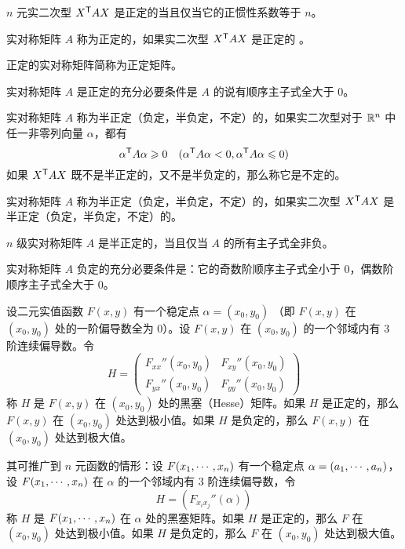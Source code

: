 \begin{theorem}
    $n$ 元实二次型 ${X}^\mathsf{T}AX$ 是正定的当且仅当它的正惯性系数等于 $n$。
\end{theorem}

\begin{definition}
    实对称矩阵 $A$ 称为正定的，如果实二次型 ${X}^\mathsf{T}AX$ 是正定的 。
\end{definition}

正定的实对称矩阵简称为正定矩阵。

\begin{theorem}
    实对称矩阵 $A$ 是正定的充分必要条件是 $A$ 的说有顺序主子式全大于 $0$。
\end{theorem}

\begin{definition}
    实对称矩阵 $A$ 称为半正定（负定，半负定，不定）的，如果实二次型对于 $\mathbb{R}^n$ 中任一非零列向量 $\alpha$，都有
    \[{\alpha}^\mathsf{T}A\alpha \geqslant 0 \quad ({\alpha}^\mathsf{T}A\alpha<0,{\alpha}^\mathsf{T}A\alpha\leqslant 0)\]
    如果 ${X}^\mathsf{T}AX$ 既不是半正定的，又不是半负定的，那么称它是不定的。
\end{definition}

\begin{definition}
    实对称矩阵 $A$ 称为半正定（负定，半负定，不定）的，如果实二次型 ${X}^\mathsf{T}AX$ 是半正定（负定，半负定，不定）的。
\end{definition}

\begin{theorem}
    $n$ 级实对称矩阵 $A$ 是半正定的，当且仅当 $A$ 的所有主子式全非负。
\end{theorem}

\begin{theorem}
    实对称矩阵 $A$ 负定的充分必要条件是：它的奇数阶顺序主子式全小于 $0$，偶数阶顺序主子式全大于 $0$。
\end{theorem}

\begin{theorem}
    设二元实值函数 $F(x,y)$ 有一个稳定点 $\alpha=(x_0,y_0)$ （即 $F(x,y)$ 在 $(x_0,y_0)$ 处的一阶偏导数全为 $0$）。设 $F(x,y)$ 在 $(x_0,y_0)$ 的一个邻域内有 3 阶连续偏导数。令
    \[H = \left(\begin{matrix}
                F_{xx}''(x_0,y_0) & F_{xy}''(x_0,y_0)  \\
                F_{yx}''(x_0,y_0) & F_{yy}''(x_0,y_0)
            \end{matrix}\right)\]
    称 $H$ 是 $F(x,y)$ 在 $(x_0,y_0)$ 处的黑塞（Hesse）矩阵。如果 $H$ 是正定的，那么 $F(x,y)$ 在 $(x_0,y_0)$ 处达到极小值。如果 $H$ 是负定的，那么 $F(x,y)$ 在 $(x_0,y_0)$ 处达到极大值。
\end{theorem}

其可推广到 $n$ 元函数的情形：设 $F(x_1,\cdots,x_n)$ 有一个稳定点 $\alpha = (a_1,\cdots,a_n)$，设 $F(x_1,\cdots,x_n)$ 在 $\alpha$ 的一个邻域内有 3 阶连续偏导数，令
\[H = (F_{x_ix_j}''(\alpha))\]
称 $H$ 是 $F(x_1,\cdots,x_n)$ 在 $\alpha$ 处的黑塞矩阵。如果 $H$ 是正定的，那么 $F$ 在 $(x_0,y_0)$ 处达到极小值。如果 $H$ 是负定的，那么 $F$ 在 $(x_0,y_0)$ 处达到极大值。